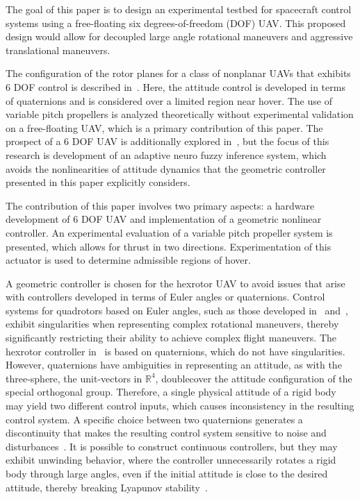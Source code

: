 \documentclass[twocolumn,letterpaper]{IEEEAerospaceCLS}  %
\renewcommand{\Re}{\mathbb{R}}
\begin{document}
The goal of this paper is to design an experimental testbed for spacecraft control systems using a free-floating six degrees-of-freedom (DOF) UAV. This proposed design would allow for decoupled large angle rotational maneuvers and aggressive translational maneuvers.
	

The configuration of the rotor planes for a class of nonplanar UAVs that exhibits 6 DOF control is described in~\cite{CroLanGCD11}. Here, the attitude control is developed in terms of quaternions and is considered over a limited region near hover. The use of variable pitch propellers is analyzed theoretically without experimental validation on a free-floating UAV, which is a primary contribution of this paper. The prospect of a 6 DOF UAV is additionally explored in~\cite{ZouCheITJ13}, but the focus of this research is development of an adaptive neuro fuzzy inference system, which avoids the nonlinearities of attitude dynamics that the geometric controller presented in this paper explicitly considers.



The contribution of this paper involves two primary aspects: a hardware development of 6 DOF UAV and implementation of a geometric nonlinear controller. An experimental evaluation of a variable pitch propeller system is presented, which allows for thrust in two directions. Experimentation of this actuator is used to determine admissible regions of hover.

A geometric controller is chosen for the hexrotor UAV to avoid issues that arise with controllers developed in terms of Euler angles or quaternions. Control systems for quadrotors based on Euler angles, such as those developed in~\cite{GueHamPIICCA05} and~\cite{BouSiePIICRA05}, exhibit singularities when representing complex rotational maneuvers, thereby significantly restricting their ability to achieve complex flight maneuvers. The hexrotor controller in~\cite{CroLanGCD11} is based on quaternions, which do not have singularities. However, quaternions have ambiguities in representing an attitude, as with the three-sphere, the unit-vectors in ${\Re}^4$, doublecover the attitude configuration of the special orthogonal group. Therefore, a single physical attitude of a rigid body may yield two different control inputs, which causes inconsistency in the resulting control system. A specific choice between two quaternions generates a discontinuity that
makes the resulting control system sensitive to noise and disturbances~\cite{MaySanPICDC09}. It is possible to construct continuous controllers, but they may exhibit unwinding behavior, where the controller unnecessarily rotates a rigid body through large angles, even if the initial attitude is close to the desired attitude, thereby breaking Lyapunov stability~\cite{BhaBerSCL00}.
\end{document}
